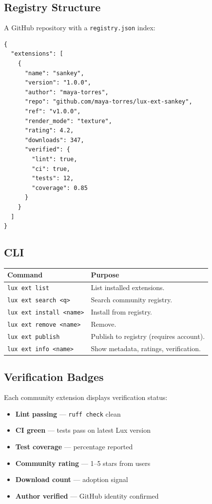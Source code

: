\documentclass[a4paper,10pt]{article}
\begin{document}
\subsection{Registry Structure}

A GitHub repository with a \texttt{registry.json} index:

\begin{lstlisting}
{
  "extensions": [
    {
      "name": "sankey",
      "version": "1.0.0",
      "author": "maya-torres",
      "repo": "github.com/maya-torres/lux-ext-sankey",
      "ref": "v1.0.0",
      "render_mode": "texture",
      "rating": 4.2,
      "downloads": 347,
      "verified": {
        "lint": true,
        "ci": true,
        "tests": 12,
        "coverage": 0.85
      }
    }
  ]
}
\end{lstlisting}

\subsection{CLI}

\begin{center}
\begin{tabular}{@{}lp{8cm}@{}}
\toprule
\textbf{Command} & \textbf{Purpose} \\
\midrule
\texttt{lux ext list}      & List installed extensions. \\
\texttt{lux ext search <q>} & Search community registry. \\
\texttt{lux ext install <name>} & Install from registry. \\
\texttt{lux ext remove <name>}  & Remove. \\
\texttt{lux ext publish}   & Publish to registry (requires account). \\
\texttt{lux ext info <name>} & Show metadata, ratings, verification. \\
\bottomrule
\end{tabular}
\end{center}

\subsection{Verification Badges}

Each community extension displays verification status:

\begin{itemize}[nosep]
  \item \textbf{Lint passing} --- \texttt{ruff check} clean
  \item \textbf{CI green} --- tests pass on latest Lux version
  \item \textbf{Test coverage} --- percentage reported
  \item \textbf{Community rating} --- 1--5 stars from users
  \item \textbf{Download count} --- adoption signal
  \item \textbf{Author verified} --- GitHub identity confirmed
\end{itemize}
\end{document}
